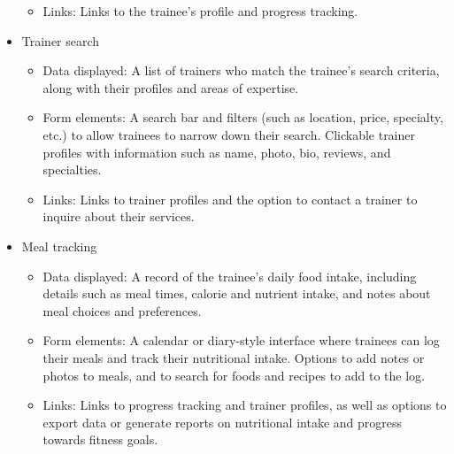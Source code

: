 \documentclass{article}
\begin{document}
\begin{itemize}
\begin{itemize}
        \item Links: Links to the trainee's profile and progress tracking.
    \end{itemize}
\item Trainer search
    \begin{itemize}
        \item Data displayed: A list of trainers who match the trainee's search criteria, along with their profiles and areas of expertise.
        \item Form elements: A search bar and filters (such as location, price, specialty, etc.) to allow trainees to narrow down their search. Clickable trainer profiles with information such as name, photo, bio, reviews, and specialties.
        \item Links: Links to trainer profiles and the option to contact a trainer to inquire about their services.
    \end{itemize}
\item Meal tracking
    \begin{itemize}
        \item Data displayed: A record of the trainee's daily food intake, including details such as meal times, calorie and nutrient intake, and notes about meal choices and preferences.
        \item Form elements: A calendar or diary-style interface where trainees can log their meals and track their nutritional intake. Options to add notes or photos to meals, and to search for foods and recipes to add to the log.
        \item Links: Links to progress tracking and trainer profiles, as well as options to export data or generate reports on nutritional intake and progress towards fitness goals.
    \end{itemize}
\end{itemize}
\end{document}
